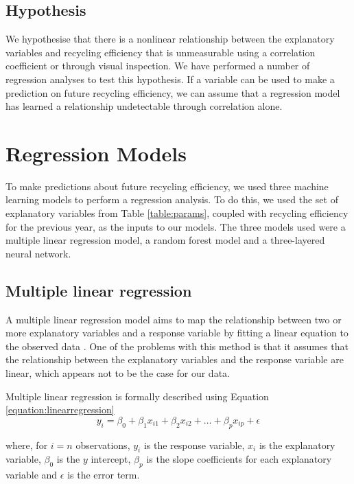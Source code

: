 \documentclass[11pt,conference]{IEEEtran}
\begin{document}
\subsection{Hypothesis}
We hypothesise that there is a nonlinear relationship between the explanatory variables and recycling efficiency that is unmeasurable using a correlation coefficient or through visual inspection. We have performed a number of regression analyses to test this hypothesis. If a variable can be used to make a prediction on future recycling efficiency, we can assume that a regression model has learned a relationship undetectable through correlation alone.

\section{Regression Models}
To make predictions about future recycling efficiency, we used three machine learning models to perform a regression analysis. To do this, we used the set of explanatory variables from Table \ref{table:params}, coupled with recycling efficiency for the previous year, as the inputs to our models. The three models used were a multiple linear regression model, a random forest model and a three-layered neural network.
\subsection{Multiple linear regression}
A multiple linear regression model aims to map the relationship between two or more explanatory variables and a response variable by fitting a linear equation to the observed data \cite{kenton_2019}. One of the problems with this method is that it assumes that the relationship between the explanatory variables and the response variable are linear, which appears not to be the case for our data.

Multiple linear regression is formally described using Equation \ref{equation:linearregression}
\begin{equation}
y_{ i } = \beta_{ 0 } + \beta_{ 1 } x _ { i 1 } + \beta _ { 2 } x _ { i 2 } + \ldots + \beta _ { p } x _ { i p } + \epsilon
\label{equation:linearregression}
\end{equation}

where, for $i=n$ observations, $y_{i}$ is the response variable, $x_i$ is the explanatory variable, $\beta_0$ is the $y$ intercept, $\beta_p$ is the slope coefficients for each explanatory variable and $\epsilon$ is the error term.
\end{document}
